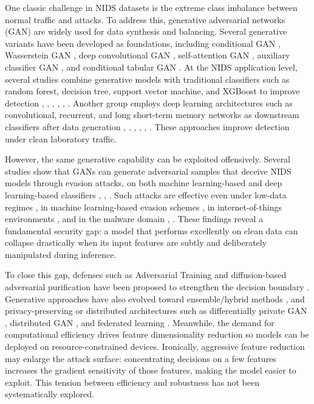 \documentclass{iaesarticle}
\begin{document}
One classic challenge in NIDS datasets is the extreme class imbalance between normal traffic and attacks. To address this, generative adversarial networks (GAN) \cite{10} are widely used for data synthesis and balancing. Several generative variants have been developed as foundations, including conditional GAN \cite{11}, Wasserstein GAN \cite{12}, deep convolutional GAN \cite{13}, self-attention GAN \cite{14}, auxiliary classifier GAN \cite{15}, and conditional tabular GAN \cite{16}. At the NIDS application level, several studies combine generative models with traditional classifiers such as random forest, decision tree, support vector machine, and XGBoost to improve detection \cite{17}, \cite{18}, \cite{19}, \cite{20}, \cite{21}, \cite{22}. Another group employs deep learning architectures such as convolutional, recurrent, and long short-term memory networks as downstream classifiers after data generation \cite{23}, \cite{24}, \cite{25}, \cite{26}, \cite{27}, \cite{28}. These approaches improve detection under clean laboratory traffic.

However, the same generative capability can be exploited offensively. Several studies show that GANs can generate adversarial samples that deceive NIDS models through evasion attacks, on both machine learning-based and deep learning-based classifiers \cite{29}, \cite{30}, \cite{31}. Such attacks are effective even under low-data regimes \cite{32}, in machine learning-based evasion schemes \cite{33}, in internet-of-things environments \cite{34}, and in the malware domain \cite{35}, \cite{36}. These findings reveal a fundamental security gap: a model that performs excellently on clean data can collapse drastically when its input features are subtly and deliberately manipulated during inference.

To close this gap, defenses such as Adversarial Training and diffusion-based adversarial purification have been proposed to strengthen the decision boundary \cite{37}. Generative approaches have also evolved toward ensemble/hybrid methods \cite{38}, \cite{39} and privacy-preserving or distributed architectures such as differentially private GAN \cite{40}, distributed GAN \cite{41}, and federated learning \cite{42}. Meanwhile, the demand for computational efficiency drives feature dimensionality reduction so models can be deployed on resource-constrained devices. Ironically, aggressive feature reduction may enlarge the attack surface: concentrating decisions on a few features increases the gradient sensitivity of those features, making the model easier to exploit. This tension between efficiency and robustness has not been systematically explored.
\end{document}

